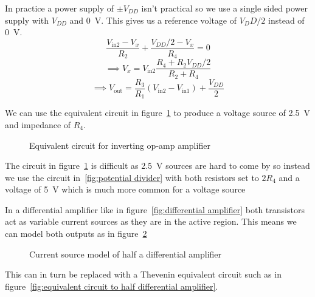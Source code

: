 \documentclass{article}
\begin{document}
    In practice a power supply of \(\pm V_{DD}\) isn't practical so we use a single sided power supply with \(V_{DD}\) and \SI{0}{V}. 
    This gives us a reference voltage of \(V_DD/2\) instead of \SI{0}{V}.
    \[\frac{V_\text{in2}-V_x}{R_2} + \frac{V_{DD}/2 - V_x}{R_4} = 0\]
    \[\implies V_x = V_\text{in2}\frac{R_4 + R_2V_{DD}/2}{R_2+R_4}\]
    \[\implies V_\text{out} = \frac{R_3}{R_1}(V_\text{in2}-V_\text{in1}) + \frac{V_{DD}}{2}\]
    
    We can use the equivalent circuit in figure~\ref{fig:equivalent circuit} to produce a voltage source of \SI{2.5}{V} and impedance of \(R_4\). 
    
    \begin{figure}[ht]
        \centering
        \caption{Equivalent circuit for inverting op-amp amplifier}
        \label{fig:equivalent circuit}
    \end{figure}

    The circuit in figure~\ref{fig:equivalent circuit} is difficult as \SI{2.5}{V} sources are hard to come by so instead we use the circuit in~\ref{fig:potential divider} with both resistors set to \(2R_4\) and a voltage of \SI{5}{V} which is much more common for a voltage source
    
    In a differential amplifier like in figure~\ref{fig:differential amplifier} both transistors act as variable current sources as they are in the active region. This means we can model both outputs as in figure~\ref{fig:current source differential amplifier}
    
    \begin{figure}[ht]
        \centering
        \caption{Current source model of half a differential amplifier}
        \label{fig:current source differential amplifier}
    \end{figure}

    This can in turn be replaced with a Thevenin equivalent circuit such as in figure~\ref{fig:equivalent circuit to half differential amplifier}.
    
\end{document}
